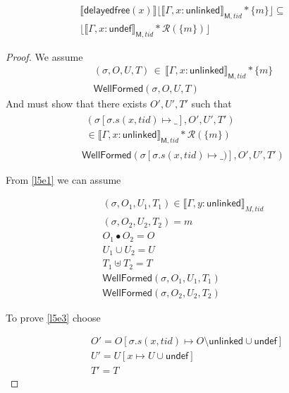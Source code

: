 \begin{Lemma}
\begin{gather}
\llbracket  \mathsf{delayedfree}(x) \rrbracket \lfloor \llbracket \Gamma,x:\mathsf{unlinked} \rrbracket_{\textsf{M},tid} * \{m\}\rfloor  \subseteq \\ 
\lfloor \llbracket \Gamma,x:\mathsf{undef} \rrbracket_{\textsf{M},tid}  * \mathcal{R}(\{m\})\rfloor 
\end{gather}
\end{Lemma}
\begin{proof}

We assume 
\begin{gather} \label{l5e1}
(\sigma,O,U,T) \, \in \, \llbracket \Gamma,x:\mathsf{unlinked} \rrbracket_{\textsf{M},tid} * \{m\}
\\
\label{l5ewfa}
\textsf{WellFormed}(\sigma,O,U,T) 
\end{gather}
And must show that there exists $O',U',T'$ such that
\begin{gather} 
\begin{split}
\label{l5e3} 
(\sigma[ \sigma.s(x,tid) \mapsto \_ ], O',U',T')  \\
\in \llbracket \Gamma, x:\mathsf{unlinked} \rrbracket_{\textsf{M},tid} * \mathcal{R}(\{m\})
\end{split}
\\
\label{l5ewfa}
\textsf{WellFormed}(\sigma[ \sigma.s(x,tid) \mapsto \_) ],O',U',T')
\end{gather}

From \ref{l5e1} we can assume 

\begin{gather} \label{l5e4}
(\sigma, O_{1}, U_{1}, T_{1}) \in \llbracket \Gamma, y:\mathsf{unlinked} \rrbracket_{M,tid}
\\
 \label{l5e5}
(\sigma, O_{2}, U_{2}, T_{2}) = m 
\\
\label{l5e6}
O_{1} \bullet O_{2} = O
\\
 \label{l5e7}
U_{1} \cup U_{2} = U
\\
 \label{l5e8}
T_{1} \uplus T_{2} = T
\\
\label{l5wfa1}
\textsf{WellFormed}(\sigma,O_{1},U_{1},T_{1})
\\
\label{l5wfa2}
\textsf{WellFormed}(\sigma,O_{2},U_{2},T_{2})
\end{gather}

To prove \ref{l5e3} choose

\[
\begin{array}{cl}
&O' = O[\sigma.s(x,tid) \mapsto O  \setminus \mathsf{unlinked} \cup \mathsf{undef}]\\
&U' = U[x \mapsto U \cup \mathsf{undef}]\\
&T' = T
\end{array}
\]


\end{proof}
